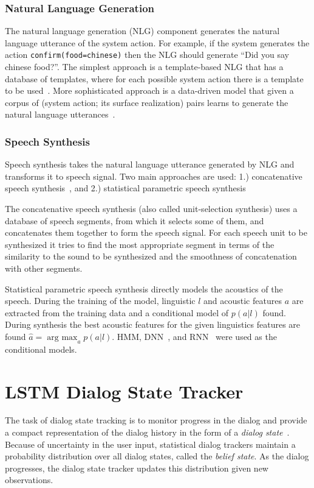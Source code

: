 \documentclass[11pt,twocolumn]{article}
\begin{document}
\subsubsection{Natural Language Generation}
The natural language generation (NLG) component generates the natural language utterance of the system action. For example, if the system generates the action \texttt{confirm(food=chinese)} then the NLG should generate ``Did you say chinese food?''. The simplest approach is a template-based NLG that has a database of templates, where for each possible system action there is a template to be used~\cite{duvsek2014alex}. More sophisticated approach is a data-driven model that given a corpus of (system action; its surface realization) pairs learns to generate the natural language utterances~\cite{mairesse2010phrase}.

\subsubsection{Speech Synthesis}
Speech synthesis takes the natural language utterance generated by NLG and transforms it to speech signal. Two main approaches are used: 1.) concatenative speech synthesis~\cite{campbell1997prosody,masuko1996speech}, and 2.) statistical parametric speech synthesis~\cite{zen2009statistical}

The concatenative speech synthesis (also called unit-selection synthesis) uses a database of speech segments, from which it selects some of them, and concatenates them together to form the speech signal. For each speech unit to be synthesized it tries to find the most appropriate segment in terms of the similarity to the sound to be synthesized and the smoothness of concatenation with other segments.

Statistical parametric speech synthesis directly models the acoustics of the speech. During the training of the model, linguistic $l$ and acoustic features $a$ are extracted from the training data and a conditional model of $p(a|l)$ found. During synthesis the best acoustic features for the given linguistics features are found $\hat{a}=\operatorname{arg~max}_a p(a|l)$. HMM\cite{yoshimuray1999simultaneous}, DNN~\cite{ze2013statistical}, and RNN~\cite{zen2015unidirectional} were used as the conditional models.

\section{LSTM Dialog State Tracker}
\label{sec:dialog-state-tracking}
The task of dialog state tracking is to monitor progress in the dialog and provide a compact representation of the dialog history in the form of a \emph{dialog state}~\cite{henderson2014second,zilka2013comparison}. Because of uncertainty in the user input, statistical dialog trackers maintain a probability distribution over all dialog states, called the \emph{belief state}. As the dialog progresses, the dialog state tracker updates this distribution given new observations.
\end{document}
